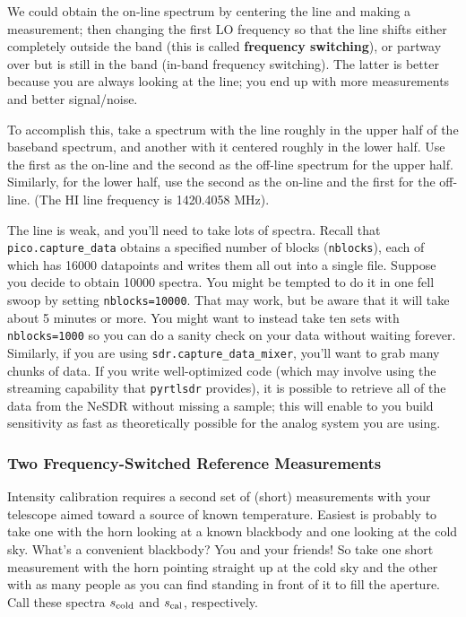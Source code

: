 \documentclass[11pt,preprint]{aastex}
\begin{document}
We could obtain the on-line
  spectrum by centering the line and making a measurement; then changing
  the first LO frequency so that the line shifts either completely
  outside the band (this is called {\bf frequency switching}), or partway
  over but is still in the band (in-band frequency
  switching). The latter is better because you are always looking at
  the line; you end up with more measurements and better signal/noise.

To accomplish this, take a spectrum with the line roughly in the upper
half of the baseband spectrum, and another with it centered roughly in
the lower half. Use the first as the on-line and the second as the
off-line spectrum for the upper half. Similarly, for the lower half,
use the second as the on-line and the first for the off-line.  (The HI
line frequency is 1420.4058 MHz).


The line is weak, and you'll need to take lots of spectra. Recall that
{\tt pico.capture\_data} obtains a specified number of blocks ({\tt nblocks}),
each of which has 16000 datapoints and writes them all out into a single
file. Suppose you decide to obtain 10000 spectra. You might be tempted
to do it in one fell swoop by setting {\tt nblocks=10000}. That
may work, but be aware that it will take about 5 minutes or more. You
might want to instead take ten sets with {\tt nblocks=1000} so you can do a
sanity check on your data without waiting forever. Similarly, if
you are using {\tt sdr.capture\_data\_mixer}, you'll want to grab many
chunks of data. If you write well-optimized code (which may involve
using the streaming capability that {\tt pyrtlsdr} provides), it is
possible to retrieve all of the data from the NeSDR without missing a
sample; this will enable to you build sensitivity as fast as theoretically
possible for the analog system you are using.

\subsubsection{Two Frequency-Switched Reference Measurements}

\noindent
Intensity calibration requires a second set of (short) measurements
  with your telescope aimed toward a source of known temperature.
  Easiest is probably to take one with the horn
  looking at a known blackbody and one looking at the cold sky. What's a
  convenient blackbody? You and your friends! So take one short
  measurement with the horn pointing straight up at the cold sky and the
  other with as many people as you can find standing in front of it to
  fill the aperture. Call these spectra
  $s_{\rm cold}$ and $s_{\rm cal}$, respectively.
\end{document}
